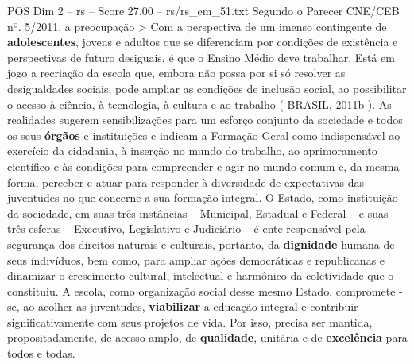 \begin{textsample}{POS Dim 2 – rs – Score 27.00 – rs/rs\_em\_51.txt}
Segundo o Parecer CNE/CEB nº. 5/2011, a preocupação > Com a perspectiva de um imenso contingente de \textbf{adolescentes}, jovens e adultos que se diferenciam por condições de existência e perspectivas de futuro desiguais, é que o Ensino Médio deve trabalhar.
Está em jogo a recriação da escola que, embora não possa por si só resolver as desigualdades sociais, pode ampliar as condições de inclusão social, ao possibilitar o acesso à ciência, à tecnologia, à cultura e ao trabalho ( BRASIL, 2011b ).
As realidades sugerem sensibilizações para um esforço conjunto da sociedade e todos os seus \textbf{órgãos} e instituições e indicam a Formação Geral como indispensável ao exercício da cidadania, à inserção no mundo do trabalho, ao aprimoramento científico e às condições para compreender e agir no mundo comum e, da mesma forma, perceber e atuar para responder à diversidade de expectativas das juventudes no que concerne a sua formação integral.
O Estado, como instituição da sociedade, em suas três instâncias – Municipal, Estadual e Federal – e suas três esferas – Executivo, Legislativo e Judiciário – é ente responsável pela segurança dos direitos naturais e culturais, portanto, da \textbf{dignidade} humana de seus indivíduos, bem como, para ampliar ações democráticas e republicanas e dinamizar o crescimento cultural, intelectual e harmônico da coletividade que o constituiu.
A escola, como organização social desse mesmo Estado, compromete -se, ao acolher as juventudes, \textbf{viabilizar} a educação integral e contribuir significativamente com seus projetos de vida.
Por isso, precisa ser mantida, propositadamente, de acesso amplo, de \textbf{qualidade}, unitária e de \textbf{excelência} para todos e todas.

\end{textsample}
